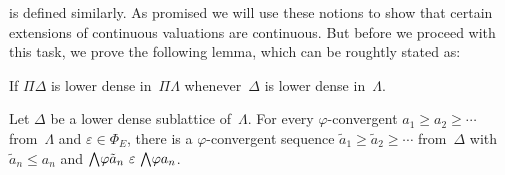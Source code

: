 \documentclass[main.tex]{subfiles}
\begin{document}
 is defined similarly.
As promised
we will use these notions to show that
certain extensions of continuous valuations are continuous.
But before we proceed with this task,
we prove the following lemma,
which can be roughtly stated as:
\begin{center}
\begin{minipage}{0.8\textwidth}
If $\Pi\Delta$ is lower dense in~$\Pi\Lambda$
whenever~$\Delta$ is lower dense in~$\Lambda$.
\end{minipage}
\end{center}
\begin{lem}
\label{lem:main}
Let $\Delta$ be a lower dense sublattice of~$\Lambda$.
For every $\varphi$-convergent 
 $a_1 \geq a_2 \geq \dotsb$ from~$\Lambda$
and $\varepsilon\in \Phi_E$,
there is a $\varphi$-convergent sequence
$\tilde a_1 \geq \tilde a_2 \geq \dotsb$ from~$\Delta$
with $\tilde a_n \leq a_n$ 
and $\bw \varphi \tilde a_n \ \varepsilon\ \bw\varphi a_n$.
\end{lem}
\end{document}
